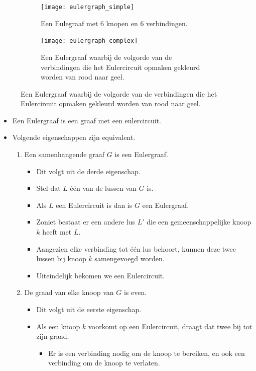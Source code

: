 \begin{figure}[ht]
\centering
\begin{subfigure}{.5\textwidth}
	\centering
	\texttt{[image: eulergraph\_simple]}
	\caption{Een Eulegraaf met 6 knopen en 6 verbindingen.}
	\label{fig:eulergraph_simple}
  \end{subfigure}%
  \begin{subfigure}{.5\textwidth}
	\centering
	\texttt{[image: eulergraph\_complex]}
	\caption{Een Eulergraaf waarbij de volgorde van de verbindingen die het Eulercircuit opmaken gekleurd worden van rood naar geel.}
	\label{fig:eulergraph_complex}
  \end{subfigure}
\end{figure}

\begin{itemize}
	\item Een Eulergraaf is een graaf met een eulercircuit. 
	\item Volgende eigenschappen zijn equivalent.
	\begin{enumerate}
		\item Een samenhangende graaf $G$ is een Eulergraaf.
		\begin{itemize}
			\item Dit volgt uit de derde eigenschap.
			\item Stel dat $L$ één van de lussen van $G$ is.
			\item Als $L$ een Eulercircuit is dan is $G$ een Eulergraaf.
			\item Zoniet bestaat er een andere lus $L'$ die een gemeenschappelijke knoop $k$ heeft met $L$.
			\item Aangezien elke verbinding tot één lus behoort, kunnen deze twee lussen bij knoop $k$ samengevoegd worden.
			\item Uiteindelijk bekomen we een Eulercircuit.
		\end{itemize}
		\item De graad van elke knoop van $G$ is even.
		\begin{itemize}
			\item Dit volgt uit de eerste eigenschap.
			\item Als een knoop $k$ voorkomt op een Eulercircuit, draagt dat twee bij tot zijn graad.
			\begin{itemize}
				\item Er is een verbinding nodig om de knoop te bereiken, en ook een verbinding om de knoop te verlaten.
			\end{itemize}
		\end{itemize}

\end{enumerate}
\end{itemize}
